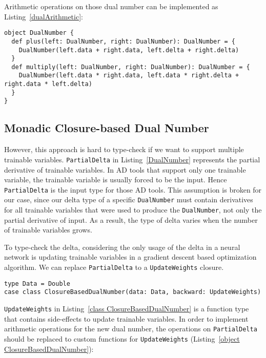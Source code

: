 Arithmetic operations on those dual number can be implemented as Listing~\ref{dualArithmetic}:

\begin{lstlisting}[float={h t b p},caption={Arithmetic operations on dual number}, label={dualArithmetic}]
object DualNumber {
  def plus(left: DualNumber, right: DualNumber): DualNumber = {
    DualNumber(left.data + right.data, left.delta + right.delta)
  }
  def multiply(left: DualNumber, right: DualNumber): DualNumber = {
    DualNumber(left.data * right.data, left.data * right.delta + right.data * left.delta)
  }
}
\end{lstlisting}

\subsection{Monadic Closure-based Dual Number}
\label{monadic dual number}

However, this approach is hard to type-check if we want to support multiple  \glspl{trainable variable}. \lstinline{PartialDelta} in Listing~\ref{DualNumber} represents the partial derivative of \glspl{trainable variable}. In AD tools that support only one \gls{trainable variable}, the \gls{trainable variable} is usually forced to be the input. Hence \lstinline{PartialDelta} is the input type for those AD tools. This assumption is broken for our case, since our delta type of a specific \lstinline{DualNumber} must contain derivatives for all \glspl{trainable variable} that were used to produce the \lstinline{DualNumber}, not only the partial derivative of input. As a result, the type of delta varies when the number of \glspl{trainable variable} grows.

To type-check the delta, considering the only usage of the delta in a neural network is updating \glspl{trainable variable} in a gradient descent based optimization algorithm. We can replace \lstinline{PartialDelta} to a \lstinline{UpdateWeights} closure.

\begin{lstlisting}[float={h t b p},caption={Replacing \lstinline{PartialDelta} to a closure}, label={class ClosureBasedDualNumber}]
type Data = Double  
case class ClosureBasedDualNumber(data: Data, backward: UpdateWeights)
\end{lstlisting}

\lstinline{UpdateWeights} in Listing~\ref{class ClosureBasedDualNumber} is a function type that contains side-effects to update \glspl{trainable variable}. In order to implement arithmetic operations for the new dual number, the operations on \lstinline{PartialDelta} should be replaced to custom functions for \lstinline{UpdateWeights} (Listing~\ref{object ClosureBasedDualNumber}):

